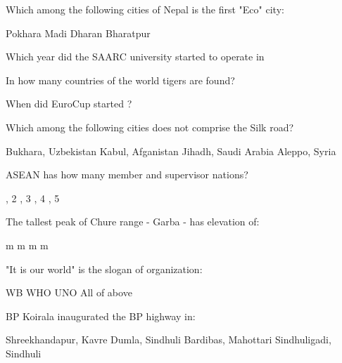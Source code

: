 \begin{questions}
\question Which among the following cities of Nepal is the first "Eco" city:
  \begin{choices}
  \choice Pokhara
  \choice Madi
  \choice Dharan
  \CorrectChoice Bharatpur
  \end{choices}

\question Which year did the SAARC university started to operate in
  \begin{choices}
  \end{choices}

\question In how many countries of the world tigers are found?
  \begin{choices}
  \end{choices}

\question When did EuroCup started ?
  \begin{choices}
  \end{choices}

\question Which among the following cities does not comprise the Silk road?
  \begin{choices}
  \choice Bukhara, Uzbekistan
  \choice Kabul, Afganistan
  \CorrectChoice Jihadh, Saudi Arabia
  \choice Aleppo, Syria
  \end{choices}

\question ASEAN has how many member and supervisor nations?
  \begin{choices}
  , 2
  , 3
  , 4
  , 5
  \end{choices}

\question The tallest peak of Chure range - Garba - has elevation of:
  \begin{choices}
   m
   m
   m
   m
  \end{choices}

\question "It is our world" is the slogan of \fillin[][3cm] organization:
  \begin{choices}
  \choice WB
  \choice WHO
  \CorrectChoice UNO
  \choice All of above
  \end{choices}

\question BP Koirala inaugurated the BP highway in:
  \begin{choices}
  \CorrectChoice Shreekhandapur, Kavre
  \choice Dumla, Sindhuli
  \choice Bardibas, Mahottari
  \choice Sindhuligadi, Sindhuli
  \end{choices}


\end{questions}
